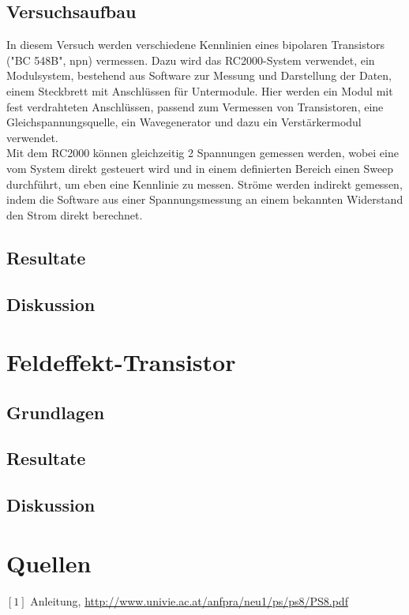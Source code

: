 \documentclass[12pt,a4paper]{article}
\begin{document}
\begin{multicols}{2}
\subsection{Versuchsaufbau}

In diesem Versuch werden verschiedene Kennlinien eines bipolaren Transistors ("BC 548B", npn) vermessen. Dazu wird das RC2000-System verwendet, ein Modulsystem, bestehend aus Software zur Messung und Darstellung der Daten, einem Steckbrett mit Anschlüssen für Untermodule. Hier werden ein Modul mit fest verdrahteten Anschlüssen, passend zum Vermessen von Transistoren, eine Gleichspannungsquelle, ein Wavegenerator und dazu ein Verstärkermodul verwendet.\\
Mit dem RC2000 können gleichzeitig 2 Spannungen gemessen werden, wobei eine vom System direkt gesteuert wird und in einem definierten Bereich einen Sweep durchführt, um eben eine Kennlinie zu messen. Ströme werden indirekt gemessen, indem die Software aus einer Spannungsmessung an einem bekannten Widerstand den Strom direkt berechnet.\\





\subsection{Resultate}


\subsection{Diskussion}

\section{Feldeffekt-Transistor}

\subsection{Grundlagen}

\subsection{Resultate}


\subsection{Diskussion}


\section{Quellen}
$[1]$ Anleitung, \url{http://www.univie.ac.at/anfpra/neu1/ps/ps8/PS8.pdf}\\

\end{multicols}
\end{document}
